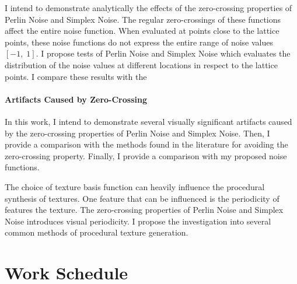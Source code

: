 \documentclass[12pt]{article}
\theoremstyle{definition}
\theoremstyle{remark}
\begin{document}
I intend to demonstrate analytically the effects of the zero-crossing properties of Perlin Noise and Simplex Noise. The regular zero-crossings of these functions affect the entire noise function. When evaluated at points close to the lattice points, these noise functions do not express the entire range of noise values $[-1,\; 1]$. I propose tests of Perlin Noise and Simplex Noise which evaluates the distribution of the noise values at different locations in respect to the lattice points. I compare these results with the 

\paragraph{Artifacts Caused by Zero-Crossing}

In this work, I intend to demonstrate several visually significant artifacts caused by the zero-crossing properties of Perlin Noise and Simplex Noise. Then, I provide a comparison with the methods found in the literature for avoiding the zero-crossing property. Finally, I provide a comparison with my proposed noise functions.

The choice of texture basis function can heavily influence the procedural synthesis of textures. One feature that can be influenced is the periodicity of features the texture. The zero-crossing properties of Perlin Noise and Simplex Noise introduces visual periodicity. I propose the investigation into several common methods of procedural texture generation.

\singlespacing
\section{Work Schedule}
\doublespacing




\end{document}
